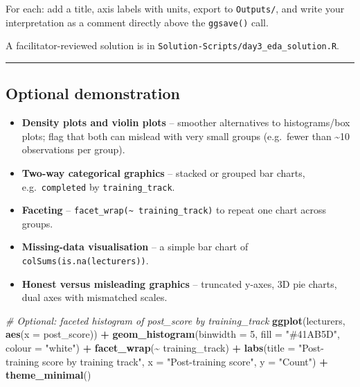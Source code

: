 \documentclass[11pt]{article}
\newenvironment{Shaded}{\begin{snugshade}}{\end{snugshade}}
\newcommand{\AttributeTok}[1]{\textcolor[rgb]{0.13,0.29,0.53}{#1}}
\newcommand{\CommentTok}[1]{\textcolor[rgb]{0.56,0.35,0.01}{\textit{#1}}}
\newcommand{\DecValTok}[1]{\textcolor[rgb]{0.00,0.00,0.81}{#1}}
\newcommand{\FunctionTok}[1]{\textcolor[rgb]{0.13,0.29,0.53}{\textbf{#1}}}
\newcommand{\NormalTok}[1]{#1}
\newcommand{\SpecialCharTok}[1]{\textcolor[rgb]{0.81,0.36,0.00}{\textbf{#1}}}
\newcommand{\StringTok}[1]{\textcolor[rgb]{0.31,0.60,0.02}{#1}}
\providecommand{\tightlist}{%
  \setlength{\itemsep}{0pt}\setlength{\parskip}{0pt}}
\begin{document}
For each: add a title, axis labels with units, export to
\texttt{Outputs/}, and write your interpretation as a comment directly
above the \texttt{ggsave()} call.

A facilitator-reviewed solution is in
\texttt{Solution-Scripts/day3\_eda\_solution.R}.

\begin{center}\rule{0.5\linewidth}{0.5pt}\end{center}

\hypertarget{optional-demonstration}{%
\subsection{Optional demonstration}\label{optional-demonstration}}

\begin{itemize}
\tightlist
\item
  \textbf{Density plots and violin plots} -- smoother alternatives to
  histograms/box plots; flag that both can mislead with very small
  groups (e.g.~fewer than \textasciitilde10 observations per group).
\item
  \textbf{Two-way categorical graphics} -- stacked or grouped bar
  charts, e.g.~\texttt{completed} by \texttt{training\_track}.
\item
  \textbf{Faceting} --
  \texttt{facet\_wrap(\textasciitilde{}\ training\_track)} to repeat one
  chart across groups.
\item
  \textbf{Missing-data visualisation} -- a simple bar chart of
  \texttt{colSums(is.na(lecturers))}.
\item
  \textbf{Honest versus misleading graphics} -- truncated y-axes, 3D pie
  charts, dual axes with mismatched scales.
\end{itemize}

\begin{Shaded}
\begin{Highlighting}[]
\CommentTok{\# Optional: faceted histogram of post\_score by training\_track}
\FunctionTok{ggplot}\NormalTok{(lecturers, }\FunctionTok{aes}\NormalTok{(}\AttributeTok{x =}\NormalTok{ post\_score)) }\SpecialCharTok{+}
  \FunctionTok{geom\_histogram}\NormalTok{(}\AttributeTok{binwidth =} \DecValTok{5}\NormalTok{, }\AttributeTok{fill =} \StringTok{"\#41AB5D"}\NormalTok{, }\AttributeTok{colour =} \StringTok{"white"}\NormalTok{) }\SpecialCharTok{+}
  \FunctionTok{facet\_wrap}\NormalTok{(}\SpecialCharTok{\textasciitilde{}}\NormalTok{ training\_track) }\SpecialCharTok{+}
  \FunctionTok{labs}\NormalTok{(}\AttributeTok{title =} \StringTok{"Post{-}training score by training track"}\NormalTok{, }\AttributeTok{x =} \StringTok{"Post{-}training score"}\NormalTok{, }\AttributeTok{y =} \StringTok{"Count"}\NormalTok{) }\SpecialCharTok{+}
  \FunctionTok{theme\_minimal}\NormalTok{()}
\end{Highlighting}
\end{Shaded}
\end{document}
